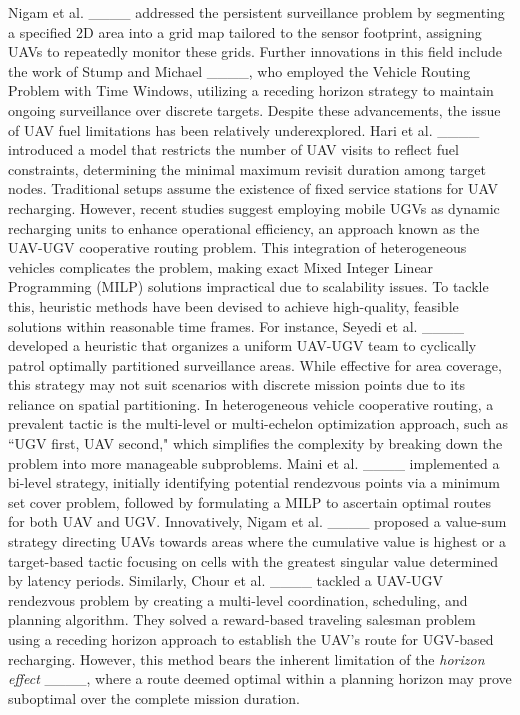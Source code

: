 Nigam et al. ____ addressed the persistent surveillance problem by segmenting a specified 2D area into a grid map tailored to the sensor footprint, assigning UAVs to repeatedly monitor these grids. Further innovations in this field include the work of Stump and Michael ____, who employed the Vehicle Routing Problem with Time Windows, utilizing a receding horizon strategy to maintain ongoing surveillance over discrete targets. Despite these advancements, the issue of UAV fuel limitations has been relatively underexplored. Hari et al. ____ introduced a model that restricts the number of UAV visits to reflect fuel constraints, determining the minimal maximum revisit duration among target nodes. Traditional setups assume the existence of fixed service stations for UAV recharging. However, recent studies suggest employing mobile UGVs as dynamic recharging units to enhance operational efficiency, an approach known as the UAV-UGV cooperative routing problem. This integration of heterogeneous vehicles complicates the problem, making exact Mixed Integer Linear Programming (MILP) solutions impractical due to scalability issues. To tackle this, heuristic methods have been devised to achieve high-quality, feasible solutions within reasonable time frames. For instance, Seyedi et al. ____ developed a heuristic that organizes a uniform UAV-UGV team to cyclically patrol optimally partitioned surveillance areas. While effective for area coverage, this strategy may not suit scenarios with discrete mission points due to its reliance on spatial partitioning. In heterogeneous vehicle cooperative routing, a prevalent tactic is the multi-level or multi-echelon optimization approach, such as ``UGV first, UAV second," which simplifies the complexity by breaking down the problem into more manageable subproblems. Maini et al. ____ implemented a bi-level strategy, initially identifying potential rendezvous points via a minimum set cover problem, followed by formulating a MILP to ascertain optimal routes for both UAV and UGV. Innovatively, Nigam et al. ____ proposed a value-sum strategy directing UAVs towards areas where the cumulative value is highest or a target-based tactic focusing on cells with the greatest singular value determined by latency periods. Similarly, Chour et al. ____ tackled a UAV-UGV rendezvous problem by creating a multi-level coordination, scheduling, and planning algorithm. They solved a reward-based traveling salesman problem using a receding horizon approach to establish the UAV’s route for UGV-based recharging. However, this method bears the inherent limitation of the \textit{horizon effect} ____, where a route deemed optimal within a planning horizon may prove suboptimal over the complete mission duration.



